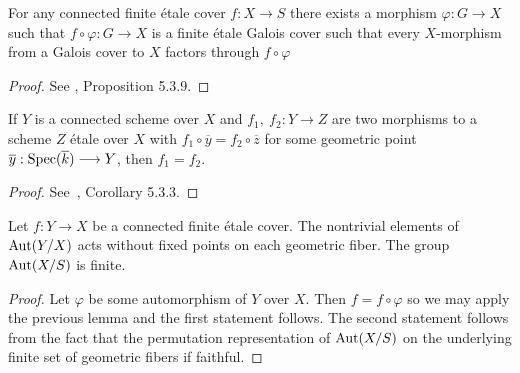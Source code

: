 \begin{proposition}\label{prop:galois_cover_construction}
	For any connected finite \'etale cover $f \colon X \to S$ there exists a morphism $\varphi \colon G \to X$ such that $f \circ \varphi \colon G \to X$ is a finite \'etale Galois cover such that every $X$-morphism from a Galois cover to $X$ factors through $f \circ \varphi$
\end{proposition}

\begin{proof}
	See \cite{Szamuely}, Proposition 5.3.9.
\end{proof}

\begin{lemma} \label{lemma:rigidity}
	If $Y$ is a connected scheme over $X$ and $f_1,\ f_2 \colon Y \to Z$ are two morphisms to a scheme $Z$ \'etale over $X$ with $f_1 \circ \overline{y} = f_2 \circ \overline{z}$ for some geometric point $\overline{y}: \operatorname{Spec}(\overline{k}) \longrightarrow Y$, then $f_1 = f_2$.
\end{lemma}

\begin{proof}
	See~\cite{Szamuely}, Corollary 5.3.3.
\end{proof}

\begin{corollary}\label{corollary:aut_is_finite}
	Let $f \colon Y \to X$ be a connected finite \'etale cover. The nontrivial elements of  $\operatorname{Aut}(Y/X)$ acts without fixed points on each geometric fiber. The group $\operatorname{Aut}(X/S)$ is finite.
\end{corollary}

\begin{proof}
	Let $\varphi$ be some automorphism of $Y$ over $X$. Then $f = f \circ \varphi$ so we may apply the previous lemma and the first statement follows. The second statement follows from the fact that the permutation representation of $\operatorname{Aut}(X/S)$ on the underlying finite set of geometric fibers if faithful.
\end{proof}

